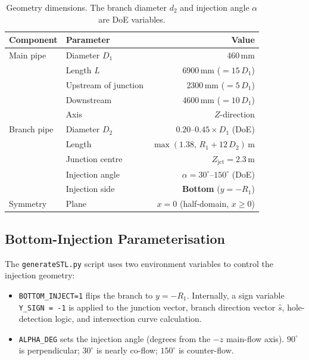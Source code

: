 \documentclass[12pt,a4paper]{report}
\begin{document}
\begin{table}[H]
\centering
\caption{Geometry dimensions.  The branch diameter $d_2$ and
         injection angle $\alpha$ are DoE variables.}
\label{tab:geom}
\begin{tabular}{@{}llr@{}}
\toprule
\textbf{Component} & \textbf{Parameter} & \textbf{Value} \\
\midrule
Main pipe   & Diameter $D_1$       & 460\,mm \\
            & Length $L$           & 6900\,mm ($= 15\,D_1$) \\
            & Upstream of junction & 2300\,mm ($= 5\,D_1$) \\
            & Downstream           & 4600\,mm ($= 10\,D_1$) \\
            & Axis                 & $Z$-direction \\
Branch pipe & Diameter $D_2$       & $0.20$--$0.45 \times D_1$ (DoE) \\
            & Length               & $\max(1.38,\, R_1 + 12\,D_2)$\,m \\
            & Junction centre      & $Z_{\mathrm{jct}} = 2.3$\,m \\
            & Injection angle      & $\alpha = 30^{\circ}$--$150^{\circ}$ (DoE) \\
            & Injection side       & \textbf{Bottom} ($y = -R_1$) \\
Symmetry    & Plane                & $x = 0$ (half-domain, $x \geq 0$) \\
\bottomrule
\end{tabular}
\end{table}

\subsection{Bottom-Injection Parameterisation}

The \texttt{generateSTL.py} script uses two environment variables to
control the injection geometry:

\begin{itemize}
  \item \texttt{BOTTOM\_INJECT=1} flips the branch to $y = -R_1$.
        Internally, a sign variable \texttt{Y\_SIGN = -1} is applied
        to the junction vector, branch direction vector $\hat{s}$,
        hole-detection logic, and intersection curve calculation.
  \item \texttt{ALPHA\_DEG} sets the injection angle (degrees from
        the $-z$ main-flow axis).  $90^{\circ}$ is perpendicular;
        $30^{\circ}$ is nearly co-flow; $150^{\circ}$ is
        counter-flow.
\end{itemize}
\end{document}
